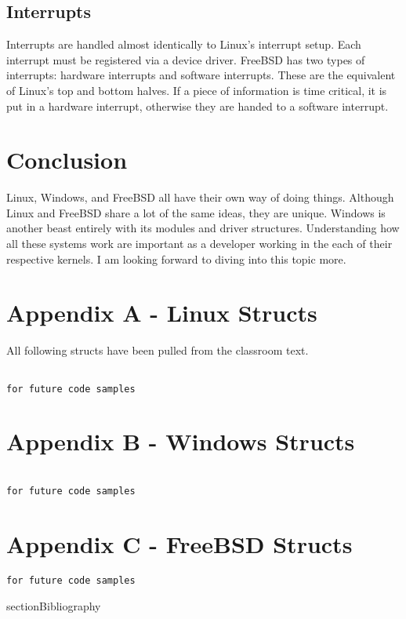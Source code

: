 \documentclass[10pt,letterpaper,onecolumn,draftclsnofoot]{IEEEtran}
\begin{document}
 \subsection{Interrupts}
 Interrupts are handled almost identically to Linux's interrupt setup. Each
 interrupt must be registered via a device driver. FreeBSD has two types of
 interrupts: hardware interrupts and software interrupts. These are the equivalent
 of Linux's top and bottom halves. If a piece of information is time critical,
 it is put in a hardware interrupt, otherwise they are handed to a software
 interrupt. \cite{freebsd2016}

\section{Conclusion}
Linux, Windows, and FreeBSD all have their own way of doing things. Although Linux
and FreeBSD share a lot of the same ideas, they are unique. Windows is another beast
entirely with its modules and driver structures. Understanding how all these systems
work are important as a developer working in the each of their respective kernels.
I am looking forward to diving into this topic more.

\clearpage
\section{Appendix A - Linux Structs}
All following structs have been pulled from the classroom text. \cite{robertlove2010}
\begin{lstlisting}

for future code samples

\end{lstlisting}

\section{Appendix B - Windows Structs}
\begin{lstlisting}

for future code samples
\end{lstlisting}
\section{Appendix C - FreeBSD Structs}
\begin{lstlisting}
for future code samples

\end{lstlisting}

section{Bibliography}


\end{document}
